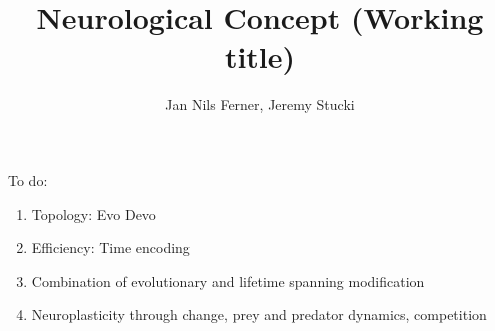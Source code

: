 \documentclass[a4paper]{article}
\title{Neurological Concept (Working title)}
\author{Jan Nils Ferner, Jeremy Stucki}
\begin{document}
\maketitle
\thispagestyle{empty}

\clearpage

\twocolumn

\begin{abstract}
	
\end{abstract}

\clearpage

\onecolumn
\tableofcontents
\twocolumn

\clearpage

To do:
\begin{enumerate}
	\item Topology: Evo Devo
	\item Efficiency: Time encoding
	\item Combination of evolutionary and lifetime spanning modification
	\item Neuroplasticity through change, prey and predator dynamics, competition
\end{enumerate}



\clearpage

\nocite{*}


\end{document}
